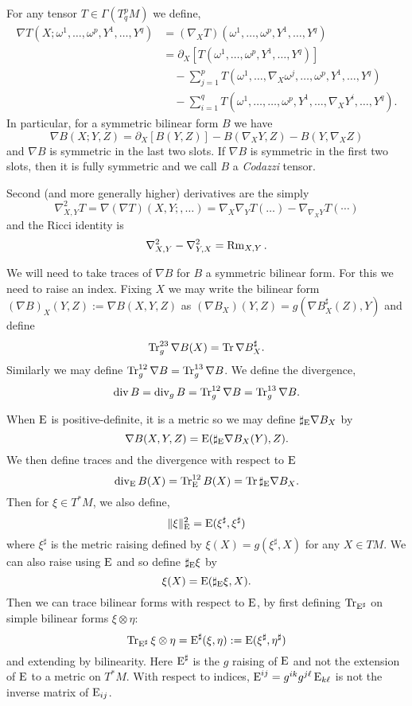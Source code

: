 \documentclass[a4paper, 12pt]{amsart}
\begin{document}
For any tensor \(T \in \Gamma(T^p_q M)\) we define,
\[
\begin{split}
\nabla T (X; \omega^1, \dots, \omega^p, Y^1, \dots, Y^q) &= (\nabla _X T) (\omega^1, \dots, \omega^p, Y^1, \dots, Y^q) \\
&= \partial_X \left[T(\omega^1, \dots, \omega^p, Y^1, \dots, Y^q)\right] \\
&\quad - \sum_{j=1}^p T(\omega^1, \dots, \nabla_X \omega^j, \dots, \omega^p, Y^1, \dots, Y^q) \\
&\quad - \sum_{i=1}^q T(\omega^1, \dots, \dots, \omega^p, Y^1, \dots, \nabla_X Y^i, \dots, Y^q).
\end{split}
\]
In particular, for a symmetric bilinear form \(B\) we have
\[
\nabla B (X; Y, Z) = \partial_X [B(Y, Z)] - B(\nabla_X Y, Z) - B(Y, \nabla_X Z)
\]
and \(\nabla B\) is symmetric in the last two slots. If \(\nabla B\) is symmetric in the first two slots, then it is fully symmetric and we call \(B\) a \emph{Codazzi} tensor.

Second (and more generally higher) derivatives are the simply
\[
\nabla^2_{X,Y} T = \nabla (\nabla T) (X, Y;, \dots) = \nabla_X \nabla_Y T(\dots) - \nabla_{\nabla_X Y} T (\cdots)
\]
and the Ricci identity is
\[
\nabla^2_{X,Y} - \nabla^2_{Y,X} = \operatorname{Rm}_{X,Y}.
\]

We will need to take traces of \(\nabla B\) for \(B\) a symmetric bilinear form. For this we need to raise an index. Fixing \(X\) we may write the bilinear form \((\nabla B)_X (Y, Z) := \nabla B (X, Y, Z)\) as \((\nabla B_X) (Y, Z) = g(\nabla B^{\sharp}_X (Z), Y)\) and define
\[
\operatorname{Tr}_g^{23} \nabla B (X) = \operatorname{Tr} \nabla B^{\sharp}_X.
\]
Similarly we may define \(\operatorname{Tr}_g^{12} \nabla B = \operatorname{Tr}_g^{13} \nabla B\). We define the divergence,
\[
\operatorname{div} B = \operatorname{div}_g B = \operatorname{Tr}_g^{12} \nabla B = \operatorname{Tr}_g^{13} \nabla B.
\]

When \(\operatorname{E}\) is positive-definite, it is a metric so we may define \(\sharp_{\operatorname{E}} \nabla B_X\) by
\[
\nabla B(X, Y, Z) = \operatorname{E}(\sharp_{\operatorname{E}} \nabla B_X (Y), Z).
\]
We then define traces and the divergence with respect to \(\operatorname{E}\)
\[
\operatorname{div}_{\operatorname{E}} B (X) = \operatorname{Tr}^{12}_{\operatorname{E}} B (X) = \operatorname{Tr} \sharp_{\operatorname{E}} \nabla B_X.
\]
Then for \(\xi \in T^{\ast} M\), we also define,
\[
\|\xi\|_{\operatorname{E}}^2 = \operatorname{E}(\xi^{\sharp}, \xi^{\sharp})
\]
where \(\xi^{\sharp}\) is the metric raising defined by \(\xi(X) = g(\xi^{\sharp}, X)\) for any \(X \in TM\). We can also raise using \(\operatorname{E}\) and so define \(\sharp_{\operatorname{E}} \xi\) by
\[
\xi(X) = \operatorname{E}(\sharp_{\operatorname{E}} \xi, X).
\]
Then we can trace bilinear forms with respect to \(\operatorname{E}\), by first defining \(\operatorname{Tr}_{\operatorname{E}^{\sharp}}\) on simple bilinear forms \(\xi \otimes \eta\):
\[
\operatorname{Tr}_{\operatorname{E}^{\sharp}} \xi \otimes \eta = \operatorname{E}^{\sharp} (\xi, \eta) := \operatorname{E}(\xi^{\sharp}, \eta^{\sharp})
\]
and extending by bilinearity. Here \(\operatorname{E}^{\sharp}\) is the \(g\) raising of \(\operatorname{E}\) and not the extension of \(\operatorname{E}\) to a metric on \(T^{\ast} M\). With respect to indices, \(\operatorname{E}^{ij} = g^{ik}g^{j\ell}\operatorname{E}_{k\ell}\) is not the inverse matrix of \(\operatorname{E}_{ij}\).
\end{document}
